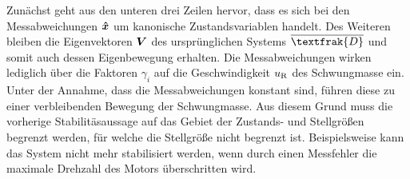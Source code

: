 Zunächst geht aus den unteren drei Zeilen hervor, dass es sich bei den Messabweichungen $\boldsymbol{\hat{x}}$ um kanonische Zustandsvariablen handelt. Des Weiteren bleiben die Eigenvektoren $\boldsymbol{V}$ des ursprünglichen Systems $\overline{\textfrak{D}}$ und somit auch dessen Eigenbewegung erhalten. Die Messabweichungen wirken lediglich über die Faktoren $\gamma_i$ auf die Geschwindigkeit $u_{\text{R}}$ des Schwungmasse ein. Unter der Annahme, dass die Messabweichungen konstant sind, führen diese zu einer verbleibenden Bewegung der Schwungmasse. Aus diesem Grund muss die vorherige Stabilitäsaussage auf das Gebiet der Zustands- und Stellgrößen begrenzt werden, für welche die Stellgröße nicht begrenzt ist. Beispielsweise kann das System nicht mehr stabilisiert werden, wenn durch einen Messfehler die maximale Drehzahl des Motors überschritten wird.

